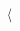 \documentclass[a4paper, 10pt]{article}
\begin{document}
\begin{align*}
\langle \begin{tikzpicture}[sibling distance=3em,level distance=2em]

\end{tikzpicture}
\end{align*}
\end{document}
